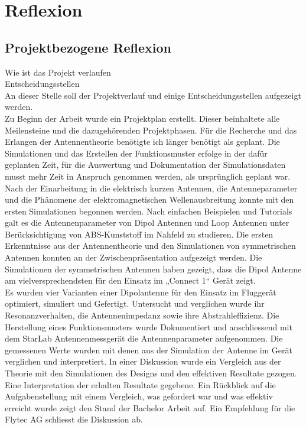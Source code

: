 
\chapter{Reflexion}
\section{Projektbezogene Reflexion}
Wie ist das Projekt verlaufen\\
Entscheidungsstellen\\

An dieser Stelle soll der Projektverlauf und einige Entscheidungsstellen aufgezeigt werden.\\
Zu Beginn der Arbeit wurde ein Projektplan erstellt. Dieser beinhaltete alle Meilensteine und die dazugehörenden Projektphasen. Für die Recherche und das Erlangen der Antennentheorie benötigte ich länger benötigt als geplant. Die Simulationen und das Erstellen der Funktionsmuster erfolge in der dafür geplanten Zeit, für die Auswertung und Dokumentation der Simulationsdaten musst mehr Zeit in Anspruch genommen werden, als ursprünglich geplant war.
Nach der Einarbeitung in die elektrisch kurzen Antennen, die Antenneparameter und die Phänomene der elektromagnetischen Wellenausbreitung konnte mit den ersten Simulationen begonnen werden. Nach einfachen Beispielen und Tutorials galt es die Antennenparameter von Dipol Antennen und Loop Antennen unter Berücksichtigung von ABS-Kunststoff im Nahfeld zu studieren.  Die ersten Erkenntnisse aus der Antennentheorie und den Simulationen von symmetrischen Antennen konnten an der Zwischenpräsentation aufgezeigt werden. Die Simulationen der symmetrischen Antennen haben gezeigt, dass die Dipol Antenne am vielversprechendsten für den Einsatz im „Connect 1“ Gerät zeigt.\\
Es wurden vier Varianten einer Dipolantenne für den Einsatz im Fluggerät optimiert, simuliert und Gefertigt. Untersucht und verglichen wurde ihr Resonanzverhalten, die Antennenimpedanz sowie ihre Abstrahleffizienz. 
Die Herstellung eines Funktionsmusters wurde Dokumentiert und anschliessend mit dem StarLab Antennenmessgerät die Antennenparameter aufgenommen. Die gemessenen Werte wurden mit denen aus der Simulation der Antenne im Gerät verglichen und interpretiert.
In einer Diskussion wurde ein Vergleich aus der Theorie mit den Simulationen des Designs und den effektiven Resultate gezogen. Eine Interpretation der erhalten Resultate gegebene. Ein Rückblick auf die Aufgabenstellung mit einem Vergleich, was gefordert war und was effektiv erreicht wurde zeigt den Stand der Bachelor Arbeit auf. Ein Empfehlung für die Flytec AG schliesst die Diskussion ab.  







